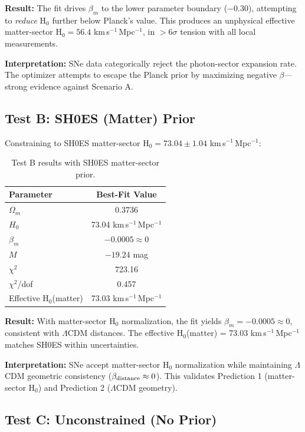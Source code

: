 \documentclass[twocolumn,superscriptaddress,prd,amsmath,amssymb]{revtex4-2}
\begin{document}
\textbf{Result:} The fit drives $\beta_m$ to the lower parameter boundary ($-0.30$), attempting to \textit{reduce} H$_0$ further below Planck's value. This produces an unphysical effective matter-sector H$_0 = 56.4$ km\,s$^{-1}$\,Mpc$^{-1}$, in $>6\sigma$ tension with all local measurements.

\textbf{Interpretation:} SNe data categorically reject the photon-sector expansion rate. The optimizer attempts to escape the Planck prior by maximizing negative $\beta$---strong evidence against Scenario A.

\subsection{Test B: SH0ES (Matter) Prior}

Constraining to SH0ES matter-sector H$_0 = 73.04 \pm 1.04$ km\,s$^{-1}$\,Mpc$^{-1}$:

\begin{table}[h]
\centering
\begin{tabular}{lc}
\hline\hline
Parameter & Best-Fit Value \\
\hline
$\Omega_m$ & 0.3736 \\
$H_0$ & 73.04 km\,s$^{-1}$\,Mpc$^{-1}$ \\
$\beta_m$ & $-0.0005 \approx 0$ \\
$M$ & $-19.24$ mag \\
\hline
$\chi^2$ & 723.16 \\
$\chi^2$/dof & 0.457 \\
\hline
Effective H$_0$(matter) & 73.03 km\,s$^{-1}$\,Mpc$^{-1}$ \\
\hline\hline
\end{tabular}
\caption{Test B results with SH0ES matter-sector prior.}
\label{tab:test_b}
\end{table}

\textbf{Result:} With matter-sector H$_0$ normalization, the fit yields $\beta_m = -0.0005 \approx 0$, consistent with $\Lambda$CDM distances. The effective H$_0$(matter) = 73.03 km\,s$^{-1}$\,Mpc$^{-1}$ matches SH0ES within uncertainties.

\textbf{Interpretation:} SNe accept matter-sector H$_0$ normalization while maintaining $\Lambda$CDM geometric consistency ($\beta_{\rm distance} \approx 0$). This validates Prediction 1 (matter-sector H$_0$) and Prediction 2 ($\Lambda$CDM geometry).

\subsection{Test C: Unconstrained (No Prior)}
\end{document}

